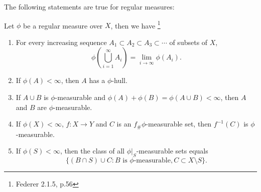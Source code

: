 The following statements are true for regular measures:
\begin{proposition}  \label{P:reg_meas}
Let $\phi$ be a regular measure over $X$, then we have
\footnote{Federer 2.1.5, p.56}
\begin{enumerate}
  \item For every increasing sequence $A_1\subset A_2\subset A_3\subset\cdots$
    of subsets of $X$,
  \[
    \phi\left( \bigcup_{i=1}^{\infty} A_i\right) = \lim_{i\to\infty} \phi(A_i).
  \]
  \item If $\phi(A)<\infty$, then $A$ has a $\phi$-hull.
  \item If $A\cup B$ is $\phi$-measurable and 
    $\phi(A)+\phi(B)=\phi(A\cup B)<\infty$, then $A$ and $B$ are
    $\phi$-measurable.
  \item If $\phi(X)<\infty$, $f:X\to Y$ and $C$ is an $f_\#\phi$-measurable set,
    then $f^{-1}(C)$ is $\phi$-measurable.
  \item If $\phi(S)<\infty$, then the class of all $\phi|_S$-measurable sets
    equals
  \[
    \{(B\cap S)\cup C: \text{$B$ is $\phi$-measurable}, C\subset X\setminus S\}.
  \]
\end{enumerate}
\end{proposition}

